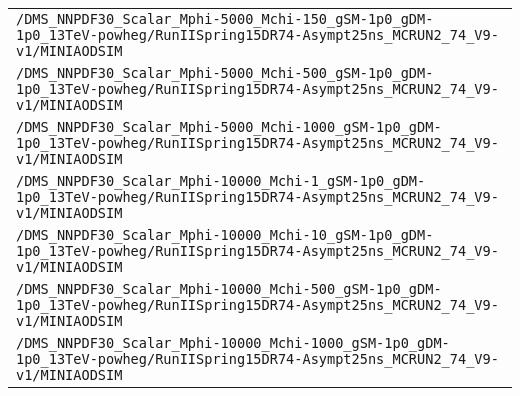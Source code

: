\begin{center}
\begin{tabular}{l}
\verb!/DMS_NNPDF30_Scalar_Mphi-5000_Mchi-150_gSM-1p0_gDM-1p0_13TeV-powheg/RunIISpring15DR74-Asympt25ns_MCRUN2_74_V9-v1/MINIAODSIM! \tabularnewline
\verb!/DMS_NNPDF30_Scalar_Mphi-5000_Mchi-500_gSM-1p0_gDM-1p0_13TeV-powheg/RunIISpring15DR74-Asympt25ns_MCRUN2_74_V9-v1/MINIAODSIM! \tabularnewline
\verb!/DMS_NNPDF30_Scalar_Mphi-5000_Mchi-1000_gSM-1p0_gDM-1p0_13TeV-powheg/RunIISpring15DR74-Asympt25ns_MCRUN2_74_V9-v1/MINIAODSIM! \tabularnewline
\verb!/DMS_NNPDF30_Scalar_Mphi-10000_Mchi-1_gSM-1p0_gDM-1p0_13TeV-powheg/RunIISpring15DR74-Asympt25ns_MCRUN2_74_V9-v1/MINIAODSIM! \tabularnewline
\verb!/DMS_NNPDF30_Scalar_Mphi-10000_Mchi-10_gSM-1p0_gDM-1p0_13TeV-powheg/RunIISpring15DR74-Asympt25ns_MCRUN2_74_V9-v1/MINIAODSIM! \tabularnewline
\verb!/DMS_NNPDF30_Scalar_Mphi-10000_Mchi-500_gSM-1p0_gDM-1p0_13TeV-powheg/RunIISpring15DR74-Asympt25ns_MCRUN2_74_V9-v1/MINIAODSIM! \tabularnewline
\verb!/DMS_NNPDF30_Scalar_Mphi-10000_Mchi-1000_gSM-1p0_gDM-1p0_13TeV-powheg/RunIISpring15DR74-Asympt25ns_MCRUN2_74_V9-v1/MINIAODSIM! \tabularnewline
\hline
\end{tabular}\end{center}
